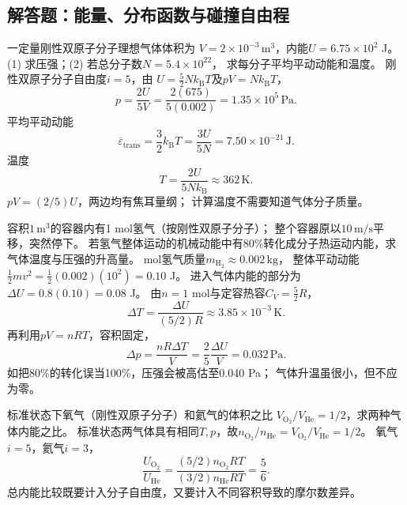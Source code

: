 \subsection{解答题：能量、分布函数与碰撞自由程}

\problemtext 一定量刚性双原子分子理想气体体积为
$V=2\times10^{-3}\,\mathrm{m^3}$，内能$U=6.75\times10^2$ J。
(1) 求压强；(2) 若总分子数$N=5.4\times10^{22}$，
求每分子平均平动动能和温度。
\workings
刚性双原子分子自由度$i=5$，由
$U=\tfrac52Nk_{\mathrm B}T$及$pV=Nk_{\mathrm B}T$，
\[
\boxed{p=\frac{2U}{5V}
=\frac{2(675)}{5(0.002)}
=1.35\times10^5\,\mathrm{Pa}}.
\]
平均平动动能
\[
\boxed{\overline\varepsilon_{\mathrm{trans}}
=\frac32k_{\mathrm B}T=\frac{3U}{5N}
=7.50\times10^{-21}\,\mathrm J}.
\]
温度
\[
\boxed{T=\frac{2U}{5Nk_{\mathrm B}}
\approx362\,\mathrm K}.
\]
\crosscheck $pV=(2/5)U$，两边均有焦耳量纲；
计算温度不需要知道气体分子质量。

\problemtext 容积$1\,\mathrm{m^3}$的容器内有1 mol氢气（按刚性双原子分子）；
整个容器原以$10\,\mathrm{m/s}$平移，突然停下。
若氢气整体运动的机械动能中有80\%转化成分子热运动内能，求气体温度与压强的升高量。
 mol氢气质量$m_{\mathrm H_2}\approx0.002\,\mathrm{kg}$，
整体平动动能
$\tfrac12mv^2=\tfrac12(0.002)(10^2)=0.10$ J。
进入气体内能的部分为
$\Delta U=0.8(0.10)=0.08$ J。
由$n=1$ mol与定容热容$C_V=\tfrac52R$，
\[
\boxed{\Delta T=\frac{\Delta U}{(5/2)R}
\approx3.85\times10^{-3}\,\mathrm K}.
\]
再利用$pV=nRT$，容积固定，
\[
\boxed{\Delta p=\frac{nR\Delta T}{V}
=\frac{2}{5}\frac{\Delta U}{V}
=0.032\,\mathrm{Pa}}.
\]
\crosscheck 如把80\%的转化误当100\%，压强会被高估至0.040 Pa；
气体升温虽很小，但不应为零。

\problemtext 标准状态下氧气（刚性双原子分子）和氦气的体积之比
$V_{\mathrm{O_2}}/V_{\mathrm{He}}=1/2$，求两种气体内能之比。
\workings
标准状态两气体具有相同$T,p$，故$n_{\mathrm{O_2}}/n_{\mathrm{He}}
=V_{\mathrm{O_2}}/V_{\mathrm{He}}=1/2$。
氧气$i=5$，氦气$i=3$，
\[
\boxed{\frac{U_{\mathrm{O_2}}}{U_{\mathrm{He}}}
=\frac{(5/2)n_{\mathrm{O_2}}RT}
 {(3/2)n_{\mathrm{He}}RT}
=\frac{5}{6}}.
\]
\crosscheck 总内能比较既要计入分子自由度，又要计入不同容积导致的摩尔数差异。

